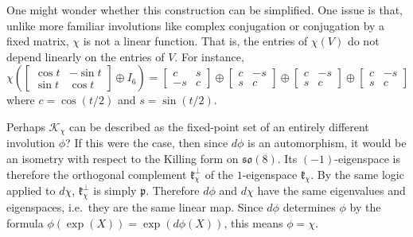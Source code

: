\documentclass[reqno]{amsart}
\theoremstyle{definition} \newtheorem{example}[theorem]{Example}
\newcommand{\so}{\mathfrak{so}}
\newcommand{\p}{\mathfrak{p}}
\newcommand{\K}{\mathcal{K}}
\renewcommand{\k}{\mathfrak{k}}
\begin{document}
One might wonder whether this construction can be simplified. One issue is that, unlike more familiar involutions like complex conjugation or conjugation by a fixed matrix, $\chi$ is not a linear function. That is, the entries of $\chi(V)$ do not depend linearly on the entries of $V$. For instance,
\begin{equation*}
\chi\left( \left[ \begin{smallmatrix} \cos t & -\sin t \\ \sin t & \cos t \end{smallmatrix} \right] \oplus I_6 \right) = \left[\begin{smallmatrix} c & s \\ -s & c \end{smallmatrix} \right] \oplus \left[\begin{smallmatrix} c & -s \\ s & c \end{smallmatrix} \right] \oplus \left[\begin{smallmatrix} c & -s \\ s & c \end{smallmatrix} \right] \oplus \left[\begin{smallmatrix} c & -s \\ s & c \end{smallmatrix} \right]
\end{equation*}
where $c = \cos(t/2)$ and $s = \sin(t/2)$. 

Perhaps $\K_{\chi}$ can be described as the fixed-point set of an entirely different involution $\phi$? If this were the case, then since $d\phi$ is an automorphism, it would be an isometry with respect to the Killing form on $\so(8)$. Its $(-1)$-eigenspace is therefore the orthogonal complement $\k_{\chi}^\perp$ of the $1$-eigenspace $\k_\chi$. By the same logic applied to $d\chi$, $\k_{\chi}^\perp$ is simply $\p$. Therefore $d\phi$ and $d\chi$ have the same eigenvalues and eigenspaces, i.e.\ they are the same linear map. Since $d\phi$ determines $\phi$ by the formula $\phi(\exp(X)) = \exp(d\phi(X))$, this means $\phi = \chi$.
 
\end{document}

